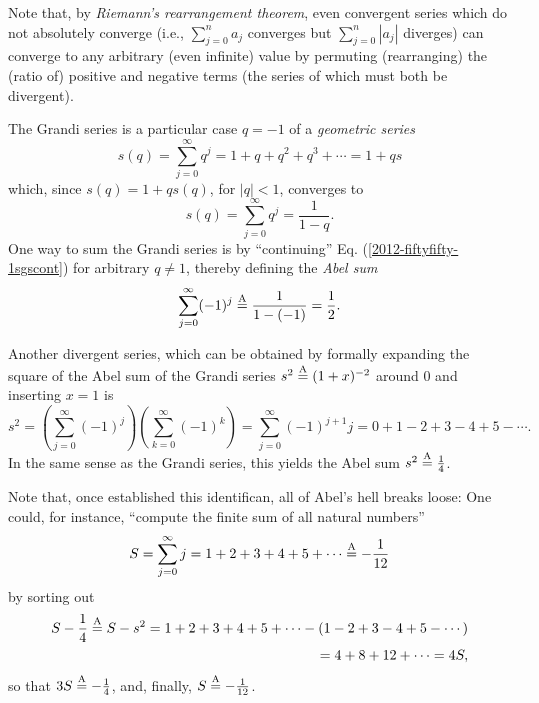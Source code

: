 Note that, by {\em Riemann's rearrangement theorem},
even convergent series  which do not absolutely converge
(i.e., $\sum_{j=0}^n a_j$ converges but $\sum_{j=0}^n \left| a_j \right|$ diverges)
can converge to any arbitrary (even infinite) value
by permuting (rearranging) the (ratio of) positive and negative terms
(the series of which must both be divergent).

The Grandi series is a particular case $q=-1$ of a {\em geometric series}
\begin{equation}
s(q) = \sum_{j=0}^\infty q^j=1+q+q^2+q^3+ \cdots  =1+q s
\label{2009-fiftyfifty-1sgs}
\end{equation}
which, since $s(q)=1+q s(q)$, for $\vert q\vert <1$, converges  to
\begin{equation}
s(q)= \sum_{j=0}^\infty q^j= \frac{1}{1-q}.
\label{2012-fiftyfifty-1sgscont}
\end{equation}
One way to sum the Grandi series is by ``continuing''
Eq. (\ref{2012-fiftyfifty-1sgscont})
for arbitrary $q\neq 1$, thereby defining the
{\em Abel sum}
\begin{equation}
\sum_{j=0}^\infty (-1)^j \stackrel{{\rm A}}{=} \frac{1}{1-(-1)} = \frac{1}{2}.
\label{2012-fiftyfifty-1sgscont1}
\end{equation}


Another divergent series,
which can be obtained by formally expanding  the square of the Abel sum of the
Grandi series $s^2 \stackrel{{\rm A}}{=} (1+x)^{-2}$
around $0$ and inserting $x=1$
\cite{Kline-83}
is
\begin{equation}
s^2  =
\left(\sum_{j=0}^\infty (-1)^j\right)
\left(\sum_{k=0}^\infty (-1)^k\right)
= \sum_{j=0}^\infty (-1)^{j+1} j = 0 + 1-2+3-4+5-\cdots
.
\label{2009-fiftyfifty-1s1}
\end{equation}
In the same sense as the Grandi series, this yields the Abel sum $s^2\stackrel{{\rm A}}{=}\frac{1}{4}$.

Note that, once established this identifican, all of Abel's hell breaks loose:
One could, for instance, ``compute the finite sum of all natural numbers''
\begin{equation}
S  =
\sum_{j=0}^\infty j = 1+2+3+4+5 + \cdots \stackrel{{\rm A}}{=} - \frac{1}{12}
\label{2016-m-ch-ds-natnumser}
\end{equation}
by sorting out
\begin{equation}
\begin{split}
S - \frac{1}{4}\stackrel{{\rm A}}{=}
S-s^2  = 1+2+3+4+5 + \cdots -
(1-2+3-4+5-\cdots )   \\
= 4 + 8+ 12 +  \cdots = 4 S
,
\label{2016-m-ch-ds-natnumser2}
\end{split}
\end{equation}
so that  $3 S
\stackrel{{\rm A}}{=}  - \frac{1}{4}$,
and, finally, $S
\stackrel{{\rm A}}{=}  - \frac{1}{12}$.


